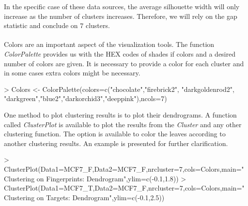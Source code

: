 \documentclass[a4paper]{article}
\begin{document}
In the specific case of these data sources, the average silhouette width will
only increase as the number of clusters increases. Therefore, we will rely on
the gap statistic and conclude on $7$ clusters.\\
\\
Colors are an important aspect of the visualization tools. The function
{\it ColorPalette} provides us with the HEX codes of shades if colors and a
desired number of colors are given. It is necessary to provide a color for each
cluster and in some cases extra colors might be necessary.
\begin{Schunk}
\begin{Sinput}
> Colors <- ColorPalette(colors=c("chocolate","firebrick2", "darkgoldenrod2",
                        "darkgreen","blue2","darkorchid3","deeppink"),ncols=7) 
\end{Sinput}
\end{Schunk}
\noindent One method to plot clustering results is to plot their dendrograms. A
function called {\it ClusterPlot} is available to plot the results from the {\it Cluster}
and any other clustering function. The option is available to color the leaves
according to another clustering results. An example is presented for further
clarification.
\begin{Schunk}
\begin{Sinput}
> ClusterPlot(Data1=MCF7_F,Data2=MCF7_F,nrcluster=7,cols=Colors,main="Clustering on 
             Fingerprints: Dendrogram",ylim=c(-0.1,1.8))
> ClusterPlot(Data1=MCF7_T,Data2=MCF7_F,nrcluster=7,cols=Colors,main="Clustering on 
             Targets: Dendrogram",ylim=c(-0.1,2.5))
\end{Sinput}
\end{Schunk}
\end{document}
